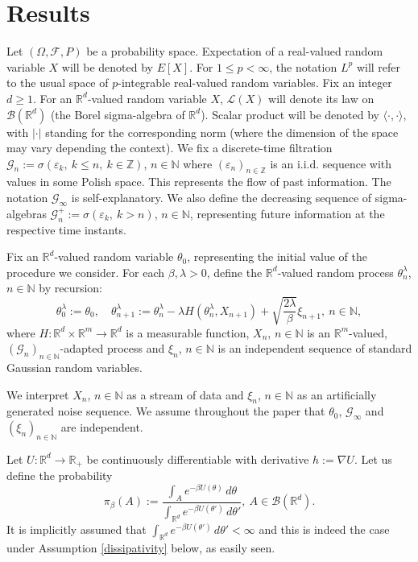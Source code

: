 \documentclass[a4paper,draft]{article}
\begin{document}
\section{Results}

Let $(\Omega,\mathcal{F},P)$ be a probability space. Expectation of a real-valued random
variable $X$ will be denoted by $E[X]$.
For $1\leq p<\infty$, the notation $L^p$ will refer to the usual space of $p$-integrable real-valued random variables.
Fix an integer $d\geq 1$. For an $\mathbb{R}^d$-valued random variable $X$,
$\mathcal{L}(X)$ will denote its law on $\mathcal{B}(\mathbb{R}^d)$ (the Borel sigma-algebra of $\mathbb{R}^d$). Scalar product will be denoted
by $\langle \cdot,\cdot\rangle$, with $|\cdot|$ standing for the
corresponding norm (where the dimension of the space may vary depending the context).
We fix a discrete-time filtration $\mathcal{G}_n:=\sigma(\varepsilon_k,\ k\leq n,\ k\in\mathbb{Z})$, 
$n\in\mathbb{N}$
where $(\varepsilon_n)_{n\in\mathbb{Z}}$ is an i.i.d. sequence with values in some Polish space. This represents
the flow of past information. The notation $\mathcal{G}_{\infty}$ is self-explanatory. 
We also define the decreasing sequence of sigma-algebras
$\mathcal{G}^+_n:=\sigma(\varepsilon_k,\ k>n)$, $n\in\mathbb{N}$, representing future information
at the respective time instants. 

Fix an $\mathbb{R}^d$-valued random variable $\theta_0$, representing the initial value of
the procedure we consider.
For each $\beta,\lambda>0$, define the $\mathbb{R}^d$-valued
random process $\theta^{\lambda}_n$, $n\in\mathbb{N}$ by recursion:
\begin{equation}\label{nab}
\theta^{\lambda}_0:=\theta_0,\quad \theta^{\lambda}_{n+1}:=\theta^{\lambda}_n-\lambda H(\theta^{\lambda}_n,X_{n+1})+\sqrt{\frac{2\lambda}{\beta}}\xi_{n+1},\ n\in\mathbb{N},
\end{equation}
where $H:\mathbb{R}^d\times\mathbb{R}^m\to\mathbb{R}^d$ is a measurable
function, $X_n$, $n\in\mathbb{N}$ is an $\mathbb{R}^m$-valued, $(\mathcal{G}_n)_{n\in\mathbb{N}}$-adapted
process and $\xi_n$, $n\in\mathbb{N}$ is
an independent sequence of standard Gaussian random variables.

We interpret $X_n$, $n\in\mathbb{N}$ as a stream of data and $\xi_n$, $n\in\mathbb{N}$ as an artificially
generated noise sequence.
We assume throughout the paper that $\theta_0$, $\mathcal{G}_{\infty}$ and $(\xi_{n})_{n\in\mathbb{N}}$
are independent.

Let $U:\mathbb{R}^d\to\mathbb{R}_+$ be continuously differentiable
with derivative $h:=\nabla U$.
Let us define the probability
$$
\pi_{\beta}(A):=\frac{\int_A e^{-\beta U(\theta)}\, d\theta}{\int_{\mathbb{R}^d} e^{-\beta U(\theta')}\, d\theta'},\
A\in\mathcal{B}(\mathbb{R}^d).
$$
It is implicitly assumed that $\int_{\mathbb{R}^d} e^{-\beta U(\theta')}\, d\theta'<\infty$ and this is
indeed the case under Assumption \ref{dissipativity} below, as easily seen.
\end{document}
